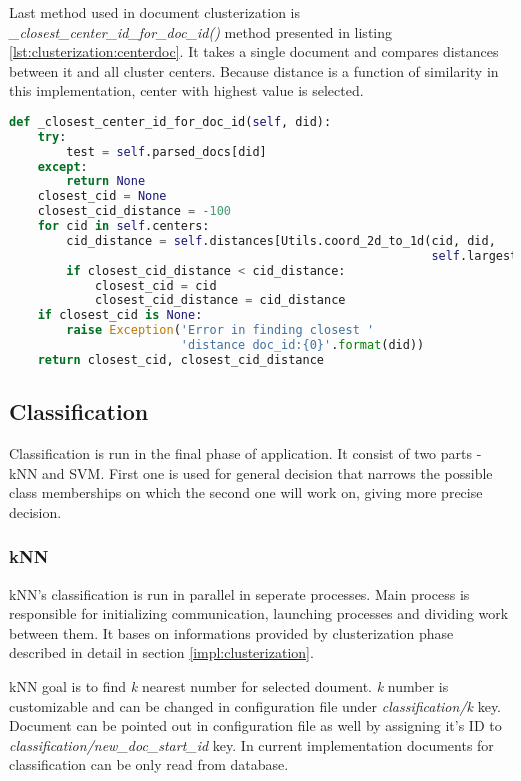 Last method used in document clusterization is \textit{ \_closest\_center\_id\_for\_doc\_id()} method presented in listing \ref{lst:clusterization:centerdoc}. It takes a single document and compares distances between it and all cluster centers. Because distance is a function of similarity in this implementation, center with highest value is selected.

\begin{lstlisting}[language=Python, caption={Clusterization.\_closest\_center\_id\_for\_doc\_id() - Finding closest center for a document during clusterization, part 2}, label={lst:clusterization:centerdoc}]
def _closest_center_id_for_doc_id(self, did):
    try:
        test = self.parsed_docs[did]
    except:
        return None
    closest_cid = None
    closest_cid_distance = -100
    for cid in self.centers:
        cid_distance = self.distances[Utils.coord_2d_to_1d(cid, did,
                                                           self.largest_id)]
        if closest_cid_distance < cid_distance:
            closest_cid = cid
            closest_cid_distance = cid_distance
    if closest_cid is None:
        raise Exception('Error in finding closest '
                        'distance doc_id:{0}'.format(did))
    return closest_cid, closest_cid_distance
\end{lstlisting}

\subsection{Classification}

Classification is run in the final phase of application. It consist of two parts - kNN and SVM. First one is used for general decision that narrows the possible class memberships on which the second one will work on, giving more precise decision.

\subsubsection{kNN}
kNN's classification is run in parallel in seperate processes. Main process is responsible for initializing communication, launching processes and dividing work between them. It bases on informations provided by clusterization phase described in detail in section \ref{impl:clusterization}.

kNN goal is to find \textit{k} nearest number for selected doument. \textit{k} number is customizable and can be changed in configuration file under \textit{classification/k} key. Document can be pointed out in configuration file as well by assigning it's ID to \textit{classification/new\_doc\_start\_id} key. In current implementation documents for classification can be only read from database.

